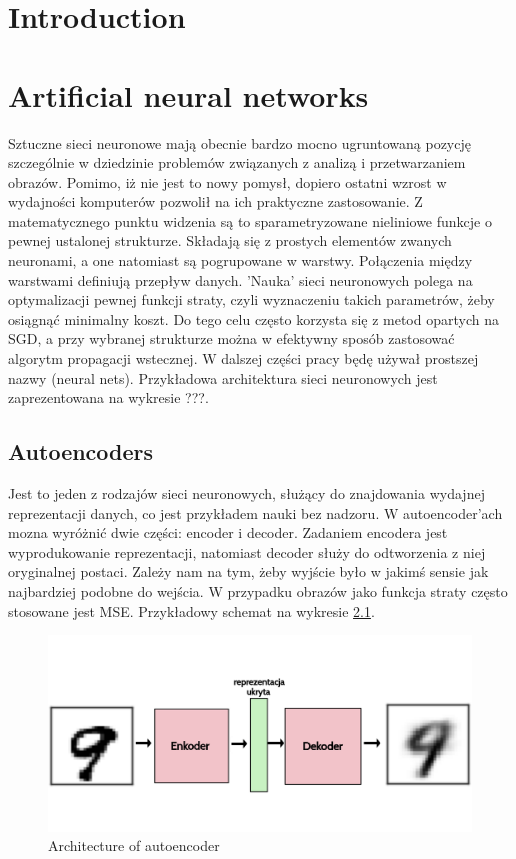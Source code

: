 \documentclass[polish,inz,shortabstract, declaration]{iithesis}
\author         {Tomasz Nanowski}
\begin{document}

\chapter{Introduction}



\chapter{Artificial neural networks}

Sztuczne sieci neuronowe mają obecnie bardzo mocno ugruntowaną pozycję szczególnie w dziedzinie problemów związanych z analizą i przetwarzaniem obrazów. Pomimo, iż nie jest to nowy pomysł, dopiero ostatni wzrost w wydajności komputerów pozwolił na ich praktyczne zastosowanie. Z matematycznego punktu widzenia są to sparametryzowane nieliniowe funkcje o pewnej ustalonej strukturze. Składają się z prostych elementów zwanych neuronami, a one natomiast są pogrupowane w warstwy. Połączenia między warstwami definiują przepływ danych. 'Nauka' sieci neuronowych polega na optymalizacji pewnej funkcji straty, czyli wyznaczeniu takich parametrów, żeby osiągnąć minimalny koszt. Do tego celu często korzysta się z metod opartych na SGD, a przy wybranej strukturze można w efektywny sposób zastosować algorytm propagacji wstecznej. W dalszej części pracy będę używał prostszej nazwy (neural nets). Przykładowa architektura sieci neuronowych jest zaprezentowana na wykresie ???.

\section{Autoencoders}

Jest to jeden z rodzajów sieci neuronowych, służący do znajdowania wydajnej reprezentacji danych, co jest przykładem nauki bez nadzoru. W autoencoder'ach mozna wyróżnić dwie części: encoder i decoder. Zadaniem encodera jest wyprodukowanie reprezentacji, natomiast decoder służy do odtworzenia z niej oryginalnej postaci. Zależy nam na tym, żeby wyjście było w jakimś sensie jak najbardziej podobne do wejścia. W przypadku obrazów jako funkcja straty często stosowane jest MSE. Przykładowy schemat na wykresie \ref{fig:autoenc}.

\begin{figure}[h]
    \centering
    \includegraphics[width=1\textwidth]{autoenc}
    \caption{Architecture of autoencoder}
    \label{fig:autoenc}
\end{figure}
\end{document}
